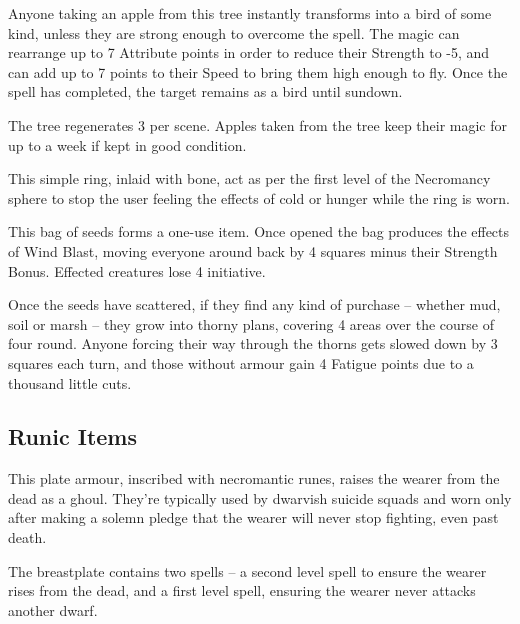 \begin{multicols}{2}

Anyone taking an apple from this tree instantly transforms into a bird of some kind, unless they are strong enough to overcome the spell.  The magic can rearrange up to 7 Attribute points in order to reduce their Strength to -5, and can add up to 7 points to their Speed to bring them high enough to fly.  Once the spell has completed, the target remains as a bird until sundown.

The tree regenerates 3 per scene.  Apples taken from the tree keep their magic for up to a week if kept in good condition.

\label{ring_asphyxiation}

This simple ring, inlaid with bone, act as per the first level of the Necromancy sphere to stop the user feeling the effects of cold or hunger while the ring is worn.


This bag of seeds forms a one-use item.
Once opened the bag produces the effects of Wind Blast, moving everyone around back by 4 squares minus their Strength Bonus.
Effected creatures lose 4 initiative.

Once the seeds have scattered, if they find any kind of purchase -- whether mud, soil or marsh -- they grow into thorny plans, covering 4 areas over the course of four round.
Anyone forcing their way through the thorns gets slowed down by 3 squares each turn, and those without armour gain 4 Fatigue points due to a thousand little cuts.

\subsection{Runic Items}

\label{eternalwarriorarmour}

This plate armour, inscribed with necromantic runes, raises the wearer from the dead as a ghoul.
They're typically used by dwarvish suicide squads and worn only after making a solemn pledge that the wearer will never stop fighting, even past death.

The breastplate contains two spells -- a second level spell to ensure the wearer rises from the dead, and a first level spell, ensuring the wearer never attacks another dwarf.


\end{multicols}

